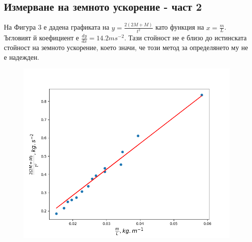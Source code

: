 \documentclass[aps, prb, twocolumn, a4paper, floatfix, reprint]{revtex4-2}
\begin{document}
\subsection{Измерване на земното ускорение - част 2}
На Фигура 3 е дадена графиката на $y=\frac{2(2M + M)}{t^2}$ като функция на $x=\frac{m}{L}$. Ъгловият й коефициент е $\frac{dy}{dx}=14.2 ms^{-2}$. Тази стойност не е близо до истинската стойност на земното ускорение, което значи, че този метод за определянето му не е надежден. 
\begin{figure}[H]
    \centering
    \caption{}
    \includegraphics[width=\columnwidth, keepaspectratio=true]{Figure_3.png}
\end{figure}
\end{document}
